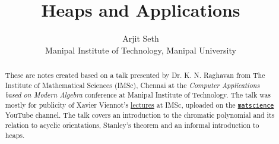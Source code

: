 \documentclass[svgnames]{article}
\theoremstyle{definition}
\theoremstyle{remark}
\theoremstyle{underline}
\theoremstyle{underline}
\begin{document}
	
	\title{\textbf{Heaps and Applications}}

	\author{\small Arjit Seth \\ \small Manipal Institute of Technology, Manipal University}
	\date{}
	\maketitle
	
	\renewcommand{\abstractname}{Context}
	\begin{abstract}
	\noindent These are notes created based on a talk presented by Dr. K. N. Raghavan from The Institute of Mathematical Sciences (IMSc), Chennai at the \emph{Computer Applications based on Modern Algebra} conference at Manipal Institute of Technology. The talk was mostly for publicity of Xavier Viennot's \href{http://www.xavierviennot.org/coursIMSc2017/contents.html}{lectures} at IMSc, uploaded on the \href{https://www.youtube.com/watch?v=vRTdLDnpIt0&list=PLhkiT_RYTEU2HhH2ljHjA-M6v2FMcLytO}{\texttt{matscience}} YouTube channel. The talk covers an introduction to the chromatic polynomial and its relation to acyclic orientations, Stanley's theorem and an informal introduction to heaps.  
	\end{abstract}
	
	\begingroup
	\let\clearpage\relax
	\tableofcontents
	\endgroup
\end{document}
